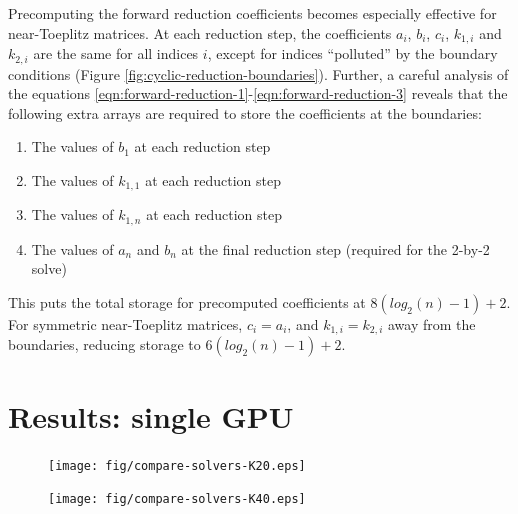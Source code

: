 \documentclass{elsarticle}
\begin{document}
Precomputing the forward reduction coefficients
becomes especially effective for near-Toeplitz matrices.
At each reduction step,
the coefficients $a_i$, $b_i$, $c_i$, $k_{1,i}$ and $k_{2,i}$ 
are the same for all indices $i$,
except for indices ``polluted'' by the boundary conditions
(Figure \ref{fig:cyclic-reduction-boundaries}).
Further, a careful analysis of the equations
\ref{eqn:forward-reduction-1}-\ref{eqn:forward-reduction-3}
reveals that the following extra arrays are required
to store the coefficients at the boundaries: 

\begin{enumerate}
    \item The values of $b_1$ at each reduction step
    \item The values of $k_{1,1}$ at each reduction step
    \item The values of $k_{1,n}$ at each reduction step
    \item The values of $a_n$ and $b_n$ at the final reduction step
        (required for the 2-by-2 solve)
\end{enumerate}

This puts the total storage for precomputed coefficients
at $8(log_2(n) - 1)+2$.
For symmetric near-Toeplitz matrices,
$c_i = a_i$, and $k_{1,i} = k_{2,i}$ away from the boundaries,
reducing storage to $6(log_2(n) - 1)+2$.



\section{Results: single GPU} \label{sec:results-single-gpu}

\begin{figure}[h!]
\begin{center}
\texttt{[image: fig/compare-solvers-K20.eps]}
\end{center}
\label{fig:compare-solvers-K20}
\end{figure}

\begin{figure}[h!]
\begin{center}
\texttt{[image: fig/compare-solvers-K40.eps]}
\end{center}
\label{fig:compare-solvers-K40}
\end{figure}
\end{document}

